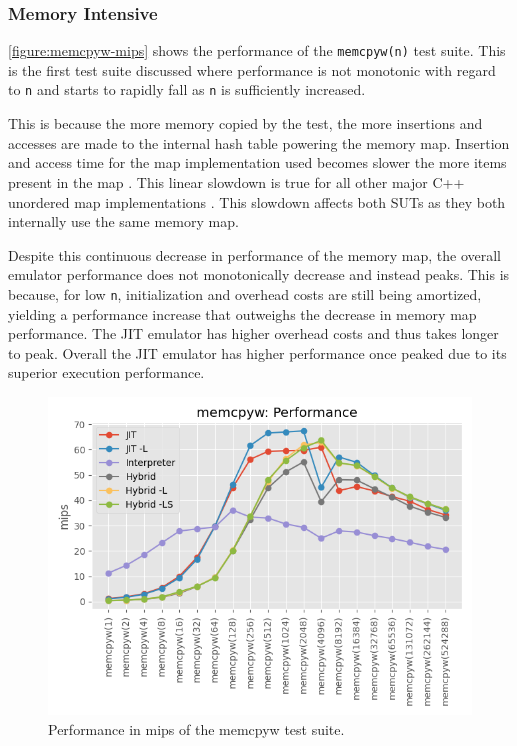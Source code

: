 \subsubsection{Memory Intensive}

\autoref{figure:memcpyw-mips} shows the performance of the \texttt{memcpyw(n)} test suite. This is the first test suite discussed where performance is not monotonic with regard to \texttt{n} and starts to rapidly fall as \texttt{n} is sufficiently increased.

This is because the more memory copied by the test, the more insertions and accesses are made to the internal hash table powering the memory map. Insertion and access time for the map implementation used becomes slower the more items present in the map \cite{tessil-benchmark}. This linear slowdown is true for all other major C++ unordered map implementations \cite{tessil-benchmark}. This slowdown affects both SUTs as they both internally use the same memory map.

Despite this continuous decrease in performance of the memory map, the overall emulator performance does not monotonically decrease and instead peaks. This is because, for low \texttt{n}, initialization and overhead costs are still being amortized, yielding a performance increase that outweighs the decrease in memory map performance. The JIT emulator has higher overhead costs and thus takes longer to peak. Overall the JIT emulator has higher performance once peaked due to its superior execution performance.

\begin{figure}[h]
    \centering
    \includegraphics[scale=0.75]{output/graphs/tests/all/memcpyw/mips.png}
    \caption{Performance in mips of the memcpyw test suite.}
    \label{figure:memcpyw-mips}
\end{figure}